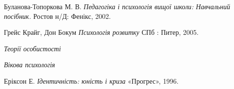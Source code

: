 \documentclass[a4paper,12pt, titlepage]{article}
\begin{document}
    \begin{thebibliography}{9}
        Буланова-Топоркова М. В.
        \textit{Педагогіка і психологія вищої школи: Навчальний посібник.}
        Ростов н/Д: Фенікс, 2002.

        Грейс Крайг, Дон Бокум
        \textit{Психологія розвитку}
        СПб : Питер, 2005.

        \textit{Теорії особистості}

        \textit{Вікова психологія}

        Еріксон Е.
        \textit{Ідентичність: юність і криза}
        «Прогрес», 1996.
    \end{thebibliography}
\end{document}
